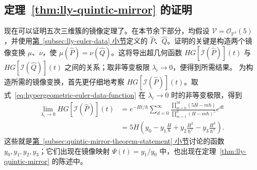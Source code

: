 \subsection{定理~\ref{thm:lly-quintic-mirror} 的证明}\label{subsec:lly-quintic-mirror-proof}
现在可以证明五次三维簇的镜像定理了。在本节余下部分，均假设 $\mathcal V=\mathcal O_{\mathbb P^4}(5)$，并使用\hyperref[subsec:lly-euler-data]{第~\ref*{subsec:lly-euler-data} 小节}定义的 $\widehat P$、$\widehat Q$。证明的关键是构造两个镜像变换 $\mu$、$\nu$，使 $\mu(\widehat P)=\nu(\widehat Q)$。这将导出超几何函数 $HG[\mathcal I(\widehat P)](t)$ 与 $HG[\mathcal I(\widehat Q)](t)$ 之间的关系；取非等变极限 $\lambda_i\to0$，便得到所需结果。
为构造所需的镜像变换，首先更仔细地考察 $HG[\mathcal I(\widehat P)](t)$。取式~\eqref{eq:hypergeometric-euler-data-function} 在 $\lambda_i\to0$ 时的非等变极限，得到
\begin{equation}\label{eq:quintic-hypergeometric-period-expansion}
\begin{aligned}
\lim_{\lambda_i\to0}HG[\mathcal I(\widehat P)](t)
&=e^{-Ht/\hbar}\sum_{d=0}^{\infty}
\frac{\prod_{m=0}^{5d}(5H-m\hbar)}{\prod_{m=1}^d(H-m\hbar)^5}e^{dt}\\
&=5H\left(y_0-y_1\frac H\hbar+y_2\frac{H^2}{\hbar^2}-y_3\frac{H^3}{\hbar^3}\right).
\end{aligned}
\end{equation}
这些就是\hyperref[subsec:quintic-mirror-theorem-statement]{第~\ref*{subsec:quintic-mirror-theorem-statement} 小节}讨论的函数 $y_0,y_1,y_2,y_3$；它们出现在镜像映射 $\Psi(t)=y_1/y_0$ 中，也出现在定理~\ref{thm:lly-quintic-mirror} 的陈述中。

